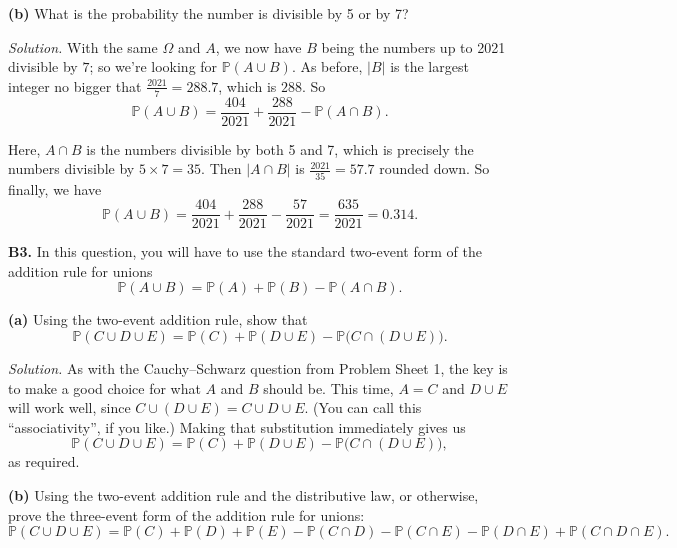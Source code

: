 \documentclass[
  a4paper,
]{book}
\theoremstyle{definition}
\theoremstyle{definition}
\theoremstyle{definition}
\theoremstyle{definition}
\theoremstyle{remark}
\begin{document}
\textbf{(b)} What is the probability the number is divisible by 5 or by 7?

\begin{myanswers}
\emph{Solution.} With the same \(\Omega\) and \(A\), we now have \(B\) being the numbers up to 2021 divisible by \(7\); so we're looking for \(\mathbb P(A \cup B)\). As before, \(|B|\) is the largest integer no bigger that \(\frac{2021}{7} = 288.7\), which is \(288\). So
\[ \mathbb P(A \cup B) = \frac{404}{2021} + \frac{288}{2021} - \mathbb P(A\cap B) . \]

Here, \(A \cap B\) is the numbers divisible by both 5 and 7, which is precisely the numbers divisible by \(5 \times 7 = 35\). Then \(|A \cap B|\) is \(\frac{2021}{35} = 57.7\) rounded down. So finally, we have
\[ \mathbb P(A \cup B) = \frac{404}{2021} + \frac{288}{2021} - \frac{57}{2021} = \frac{635}{2021} = 0.314. \]

\end{myanswers}

\textbf{B3.} In this question, you will have to use the standard two-event form of the addition rule for unions
\[ \mathbb P(A \cup B) = \mathbb P(A) + \mathbb P(B) - \mathbb P(A \cap B) . \]

\textbf{(a)} Using the two-event addition rule, show that
\[ \mathbb P(C \cup D \cup E) = \mathbb P(C) + \mathbb P(D \cup E) - \mathbb P\big(C \cap (D \cup E)\big).  \]

\begin{myanswers}
\emph{Solution.} As with the Cauchy--Schwarz question from Problem Sheet 1, the key is to make a good choice for what \(A\) and \(B\) should be. This time, \(A = C\) and \(D \cup E\) will work well, since \(C \cup (D \cup E) = C \cup D \cup E\). (You can call this ``associativity'', if you like.) Making that substitution immediately gives us
\[ \mathbb P(C \cup D \cup E) = \mathbb P(C) + \mathbb P(D \cup E) - \mathbb P\big(C \cap (D \cup E)\big) ,  \]
as required.

\end{myanswers}

\textbf{(b)} Using the two-event addition rule and the distributive law, or otherwise, prove the three-event form of the addition rule for unions:
\[
  \mathbb P(C \cup D \cup E) = \mathbb P(C) + \mathbb P(D) + \mathbb P(E) 
  - \mathbb P(C \cap D) - \mathbb P(C \cap E) - \mathbb P(D \cap E) + \mathbb P(C \cap D \cap E) .
\]
\end{document}
